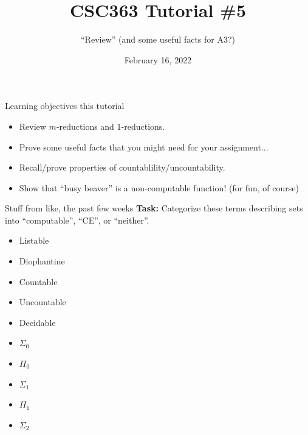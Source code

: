 \documentclass{beamer}
\title{CSC363 Tutorial \#5}
\subtitle{``Review'' (and some useful facts for A3?)}
\date{February 16, 2022}
\institute{}
\begin{document}
\maketitle

\begin{frame}{Learning objectives this tutorial}
\begin{itemize}
\item Review $m$-reductions and $1$-reductions.
\item Prove some useful facts that you might need for your assignment...
\item Recall/prove properties of countablility/uncountability.
\item Show that ``busy beaver'' is a non-computable function! (for fun, of course)
\end{itemize}
\end{frame}

\begin{frame}{Stuff from like, the past few weeks}
\textbf{Task:} Categorize these terms describing sets into ``computable'', ``CE'', or ``neither''.
\vspace{2mm}

\begin{center}
\begin{minipage}{0.4\textwidth}
\begin{itemize}
    \item Listable
    \item Diophantine
    \item Countable
    \item Uncountable
    \item Decidable
\end{itemize}
\end{minipage}
\begin{minipage}{0.4\textwidth}
\begin{itemize}
    \item $\Sigma_0$
    \item $\Pi_0$
    \item $\Sigma_1$
    \item $\Pi_1$
    \item $\Sigma_2$
\end{itemize}
\end{minipage}
\end{center}
\end{frame}
\end{document}
